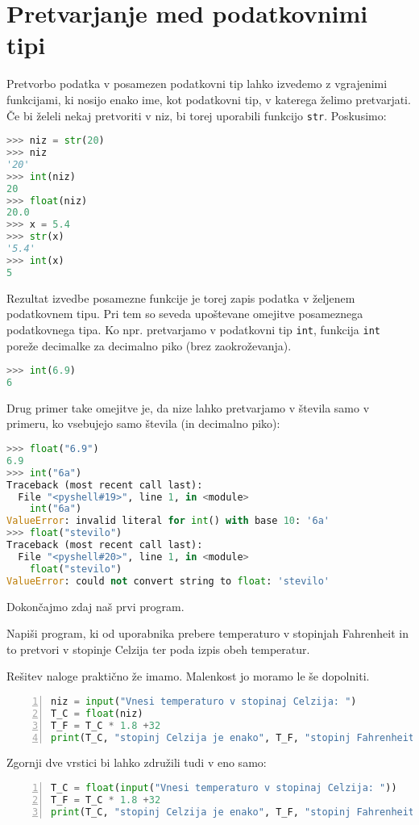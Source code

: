 \section{Pretvarjanje med podatkovnimi tipi}
Pretvorbo podatka v posamezen podatkovni tip lahko izvedemo z vgrajenimi funkcijami, ki nosijo enako ime, kot podatkovni tip, v katerega želimo pretvarjati. Če bi želeli nekaj pretvoriti v niz, bi torej uporabili funkcijo \texttt{str}. Poskusimo:
\begin{lstlisting}[language=Python]
>>> niz = str(20)
>>> niz
'20'
>>> int(niz)
20
>>> float(niz)
20.0
>>> x = 5.4
>>> str(x)
'5.4'
>>> int(x)
5
\end{lstlisting}
Rezultat izvedbe posamezne funkcije je torej zapis podatka v željenem podatkovnem tipu. Pri tem so seveda upoštevane omejitve posameznega podatkovnega tipa. Ko npr. pretvarjamo v podatkovni tip \texttt{int}, funkcija \texttt{int} poreže decimalke za decimalno piko (brez zaokroževanja). 
\begin{lstlisting}[language=Python]
>>> int(6.9)
6
\end{lstlisting}
Drug primer take omejitve je, da nize lahko pretvarjamo v števila samo v primeru, ko vsebujejo samo števila (in decimalno piko):
\begin{lstlisting}[language=Python]
>>> float("6.9")
6.9
>>> int("6a")
Traceback (most recent call last):
  File "<pyshell#19>", line 1, in <module>
    int("6a")
ValueError: invalid literal for int() with base 10: '6a'
>>> float("stevilo")
Traceback (most recent call last):
  File "<pyshell#20>", line 1, in <module>
    float("stevilo")
ValueError: could not convert string to float: 'stevilo'
\end{lstlisting}

Dokončajmo zdaj naš prvi program.
\begin{zgled}
Napiši program, ki od uporabnika prebere temperaturo v stopinjah Fahrenheit in to pretvori v stopinje Celzija ter poda izpis obeh temperatur.
\end{zgled}
\begin{resitev}
Rešitev naloge praktično že imamo. Malenkost jo moramo le še dopolniti.
\begin{lstlisting}[language=Python,numbers=left]
niz = input("Vnesi temperaturo v stopinaj Celzija: ")
T_C = float(niz)
T_F = T_C * 1.8 +32
print(T_C, "stopinj Celzija je enako", T_F, "stopinj Fahrenheit.")
\end{lstlisting}
Zgornji dve vrstici bi lahko združili tudi v eno samo:
\begin{lstlisting}[language=Python,numbers=left]
T_C = float(input("Vnesi temperaturo v stopinaj Celzija: "))
T_F = T_C * 1.8 +32
print(T_C, "stopinj Celzija je enako", T_F, "stopinj Fahrenheit.")
\end{lstlisting}
\end{resitev}

